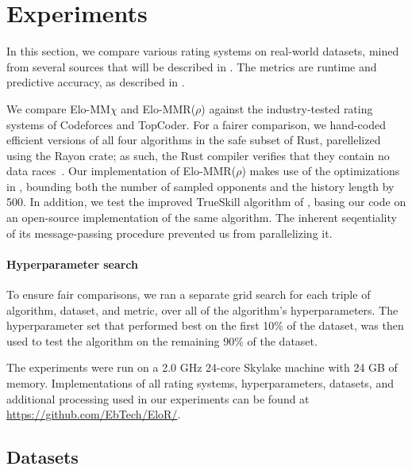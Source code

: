 \section{Experiments}
\label{sec:experiments}
In this section, we compare various rating systems on real-world datasets, mined from several sources that will be described in . The metrics are runtime and predictive accuracy, as described in .

We compare Elo-MM$\chi$ and Elo-MMR($\rho$) against the industry-tested rating systems of Codeforces and TopCoder. For a fairer comparison, we hand-coded efficient versions of all four algorithms in the safe subset of Rust, parellelized using the Rayon crate; as such, the Rust compiler verifies that they contain no data races~\cite{stone2017rayon}. Our implementation of Elo-MMR($\rho$) makes use of the optimizations in , bounding both the number of sampled opponents and the history length by 500. In addition, we test the improved TrueSkill algorithm of \cite{NS10}, basing our code on an open-source implementation of the same algorithm. The inherent seqentiality of its message-passing procedure prevented us from parallelizing it.

\paragraph{Hyperparameter search}
To ensure fair comparisons, we ran a separate grid search for each triple of algorithm, dataset, and metric, over all of the algorithm's hyperparameters. The hyperparameter set that performed best on the first 10\% of the dataset, was then used to test the algorithm on the remaining 90\% of the dataset. 

The experiments were run on a 2.0 GHz 24-core Skylake machine with 24 GB of memory. Implementations of all rating systems, hyperparameters, datasets, and additional processing used in our experiments can be found at \url{https://github.com/EbTech/EloR/}.


\subsection{Datasets}
\label{sec:datasets}

